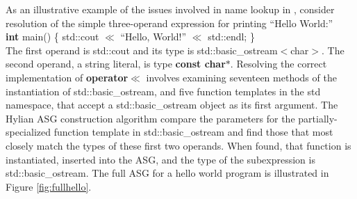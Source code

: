 As an illustrative example of the issues involved in name lookup
in {\CPP}, consider resolution of the simple three-operand expression 
for printing ``Hello World:''\\ 
\verb++\textsf{\textbf{int} main() \{ std::cout $\ll$ ``Hello, World!'' $\ll$ std::endl; \} }\\
The first operand is \textsf{std::cout} and its type is
{\sf std::ba\-sic\-\_ostream\-$<$char$>$}. The second operand,
a string literal, is type {\sf \textbf{const char}$\ast$}.
Resolving the correct implementation of \textsf{\textbf{operator}$\ll$}
involves examining seventeen methods of the instantiation of
\textsf{std::ba\-sic\_o\-stream}, and five function templates in the
\textsf{std} namespace, that accept a \textsf{std::basic\_ostream}
object as its first argument. 
The Hylian ASG construction algorithm compare the parameters 
for the partially-specialized function template in
\textsf{std::ba\-sic\_o\-stream} and find
those that most closely match the types 
of these first two operands.  When found, that function is instantiated,
inserted into the ASG, and the type of the subexpression is
\textsf{std::basic\_ostream}.
The full ASG for a {\sf hello world} program is illustrated 
in Figure \ref{fig:fullhello}.

